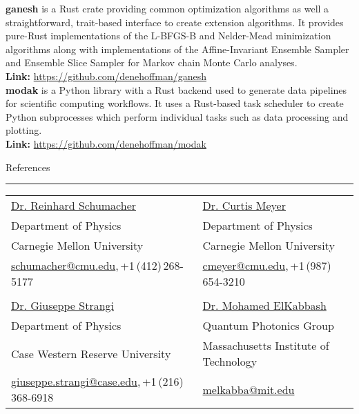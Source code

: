 \documentclass[letterpaper,11pt,oneside]{article}
\newcommand{\sectionheader}[1]{%
{\Large{#1}}
\vspace{2ex}
\hrule
\vspace{2ex}
}
\begin{document}
\textbf{ganesh} is a Rust crate providing common optimization algorithms as well a straightforward, trait-based interface to create extension algorithms. It provides pure-Rust implementations of the L-BFGS-B and Nelder-Mead minimization algorithms along with implementations of the Affine-Invariant Ensemble Sampler and Ensemble Slice Sampler for Markov chain Monte Carlo analyses.\\
\textbf{Link:} \href{https://github.com/denehoffman/ganesh}{https://github.com/denehoffman/ganesh}\\

\textbf{modak} is a Python library with a Rust backend used to generate data pipelines for scientific computing workflows. It uses a Rust-based task scheduler to create Python subprocesses which perform individual tasks such as data processing and plotting.\\
\textbf{Link:} \href{https://github.com/denehoffman/modak}{https://github.com/denehoffman/modak}\\

\newpage

\sectionheader{References}
\noindent \begin{tabular}{@{} l l}
 \href{http://www-meg.phys.cmu.edu/~schumach/}{Dr. Reinhard Schumacher} & \href{http://www.curtismeyer.com/index.php/main}{Dr. Curtis Meyer} \\
 Department of Physics &  Department of Physics  \\
 Carnegie Mellon University &  Carnegie Mellon University \\
 \small{\href{mailto:schumacher@cmu.edu}{schumacher@cmu.edu},\,+1\,(412)\,268-5177} & \small{\href{mailto:cmeyer@cmu.edu}{cmeyer@cmu.edu},\,+1\,(987)\,654-3210} \\
& \\
 \href{http://nanoplasm.wrphysics.org/}{Dr. Giuseppe Strangi} & \href{https://scholar.google.com/citations?user=bhQY_u8AAAAJ&hl=en}{Dr. Mohamed ElKabbash}  \\
 Department of Physics &  Quantum Photonics Group\\
 Case Western Reserve University &  Massachusetts Institute of Technology \\
 \small{\href{mailto:giuseppe.strangi@case.edu}{giuseppe.strangi@case.edu},\,+1\,(216)\,368-6918} & \small{\href{mailto:melkabba@mit.edu}{melkabba@mit.edu}} \\
\end{tabular}
\end{document}
